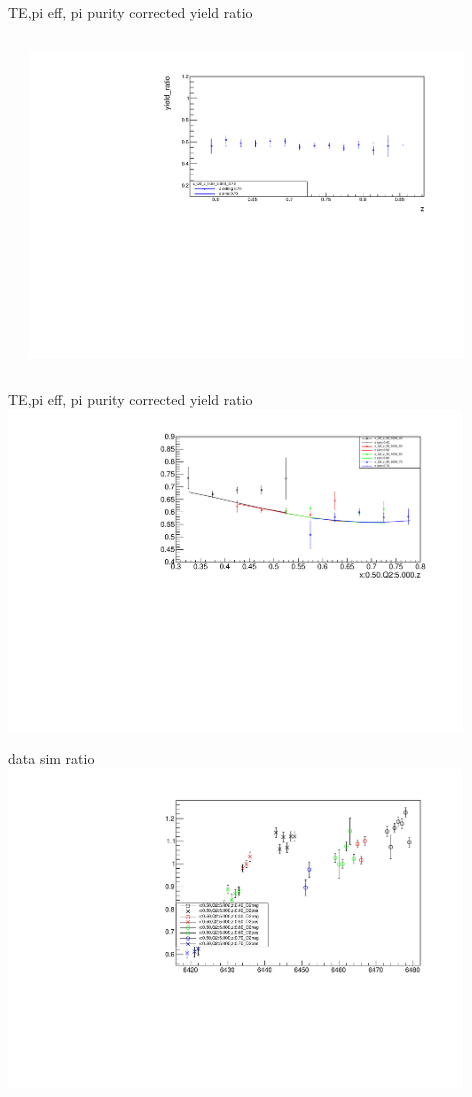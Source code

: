 \begin{frame}{TE,pi eff, pi purity corrected yield ratio}
\begin{columns}
\begin{column}[T]{0.5\textwidth}
\end{column}
\begin{column}[T]{0.5\textwidth}
\includegraphics[width = 0.9\textwidth]{results/yield/statistics_corr/x_Q2_z_50_5000_70_ratio.pdf}
\end{column}
\end{columns}
\end{frame}
\begin{frame}{TE,pi eff, pi purity corrected yield ratio}
\includegraphics[width = 0.9\textwidth]{results/yield/statistics_corr/x_Q2_50_5000_ratio.pdf}
\end{frame}
\begin{frame}{data sim ratio}
    \includegraphics[width = 0.9\textwidth]{results/yield/run_info_pdf/x_Q2_50_5000_data_simc_ratio.pdf}
\end{frame}
